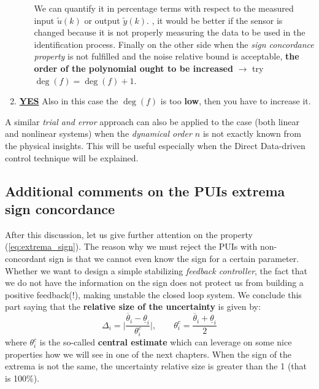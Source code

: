 \begin{enumerate}
\begin{itemize}
{            We can quantify it in percentage terms with respect to the measured input $\tilde{u}(k)$ or output $\tilde{y}(k)$.
         }, it would be better if the sensor is changed because it is not properly measuring the data to be used in the identification process. Finally on the other side when the \textit{sign concordance property} is not fulfilled and the noise relative bound is acceptable, \textbf{the order of the polynomial ought to be increased} $\to$ try $\deg(f)=\deg(f)+1$. 
     \end{itemize} 
    \item {\Large{\color{red}\underline{\textbf{YES}}}} Also in this case the $\deg(f)$ is too \textbf{low}, then you have to increase it.
\end{enumerate}

\noindent
\begin{remark}
    A similar \textit{trial and error} approach can also be applied to the case (both linear and nonlinear systems) when the \textit{dynamical order $n$} is not exactly known from the physical insights. This will be useful especially when the Direct Data-driven control technique will be explained.
\end{remark}

\noindent
\subsection{Additional comments on the PUIs extrema sign concordance}
After this discussion, let us give further attention on the property (\ref{eq:extrema_sign}). The reason why we must reject the PUIs with non-concordant sign is that we cannot even know the sign for a certain parameter. Whether we want to design a simple stabilizing \textit{feedback controller}, the fact that we do not have the information on the sign does not protect us from building a positive feedback(!), making unstable the closed loop system. We conclude this part saying that the \textbf{relative size of the uncertainty} is given by: 
\begin{equation}
    \Delta_i = \bigg\vert \frac{\overline{\theta}_i-\underline{\theta}_i}{\theta_i^c} \bigg\vert, \qquad
    \theta_i^c = \frac{\overline{\theta}_i+\underline{\theta}_i}{2}
\end{equation}
where $\theta_i^c$ is the so-called \textbf{central estimate}  which can leverage on some nice properties how we will see in one of the next chapters. When the sign of the extrema is not the same, the uncertainty relative size is greater than the 1 (that is 100\%).

